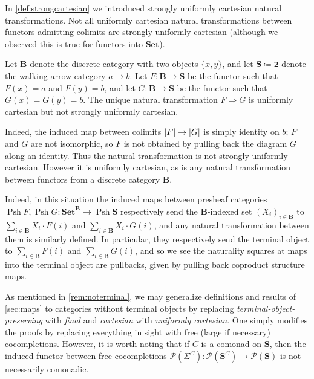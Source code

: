 \documentclass[11pt, oneside, article]{memoir}
\theoremstyle{plain}
\theoremstyle{definition}
\theoremstyle{remark}
\newenvironment{counterexample}
{\renewcommand\qedsymbol{$\lrcorner$}%
  \pushQED{\qed}\mycounterexample}
{\popQED\endmycounterexample}
\DeclareMathOperator{\Psh}{Psh}
\DeclarePairedDelimiter{\abs}{\lvert}{\rvert}
\newcommand{\namedcat}[1]{\mathbf{#1}}
\newcommand{\cat}[1]{\mathbf{#1}}
\newcommand{\Set}{\namedcat{Set}}
\newcommand{\CoalgOn}[2]{{#2}^{#1}}
\newcommand{\CoalgS}[1]{\CoalgOn{#1}{\bS}}
\newcommand{\pts}[1]{{\abs{#1}}}
\newcommand{\carr}{\Sigma}
\newcommand{\arro}{\mathbf{2}}
\newcommand{\car}[1]{\carr^{#1}}
\newcommand{\carC}{\car{\cC}}
\newcommand{\Coco}[1]{\mathcal{P}(#1)}
\newcommand{\setof}[1]{\{#1\}}
\newcommand{\cmnd}[1]{{#1}}
\newcommand{\cC}{\cmnd{C}}
\newcommand{\bB}{\cat{B}}
\newcommand{\bS}{\cat{S}}
\newcommand{\CS}{\CoalgS{\cC}}
\begin{document}
In \cref{def:strongcartesian} we introduced strongly uniformly
cartesian natural transformations. Not all uniformly cartesian natural
transformations between functors admitting colimits are strongly
uniformly cartesian (although we observed this is true for functors
into $\Set$).

\begin{counterexample}[Non-strongly uniformly cartesian]
  Let $\bB$ denote the discrete category with two objects
  $\setof{x, y}$, and let $\bS \coloneqq \arro$ denote the walking
  arrow category $a \to b$. Let $F \colon \bB \to \bS$ be the functor
  such that $F(x) = a$ and $F(y) = b$, and let $G \colon \bB \to \bS$
  be the functor such that $G(x) = G(y) = b$. The unique natural
  transformation $F \Rightarrow G$ is uniformly cartesian but not
  strongly uniformly cartesian.

  Indeed, the induced map between colimits $\pts{F} \to \pts{G}$ is
  simply identity on $b$; $F$ and $G$ are not isomorphic, so $F$ is
  not obtained by pulling back the diagram $G$ along an identity. Thus
  the natural transformation is not strongly uniformly
  cartesian. However it is uniformly cartesian, as is any natural
  transformation between functors from a discrete category
  $\bB$.

  Indeed, in this situation the induced maps between presheaf
  categories $\Psh{F}, \Psh{G} \colon \Set^\bB \to \Psh{\bS}$
  respectively send the $\bB$-indexed set $(X_i)_{i \in \bB}$ to
  $\sum_{i \in \bB} X_i \cdot F(i)$ and
  $\sum_{i \in \bB} X_i \cdot G(i)$, and any natural transformation
  between them is similarly defined. In particular, they respectively
  send the terminal object to $\sum_{i \in \bB} F(i)$ and
  $\sum_{i \in \bB} G(i)$, and so we see the naturality squares at
  maps into the terminal object are pullbacks, given by pulling back
  coproduct structure maps.
\end{counterexample}

As mentioned in \cref{rem:noterminal}, we may generalize definitions
and results of \cref{sec:maps} to categories without terminal objects
by replacing \emph{terminal-object-preserving} with \emph{final} and
\emph{cartesian} with \emph{uniformly cartesian}. One simply modifies
the proofs by replacing everything in sight with free (large if
necessary) cocompletions. However, it is worth noting that if $\cC$ is
a comonad on $\bS$, then the induced functor between free
cocompletions $\Coco{\carC} \colon \Coco{\CS} \to \Coco{\bS}$ is not
necessarily comonadic.
\end{document}
